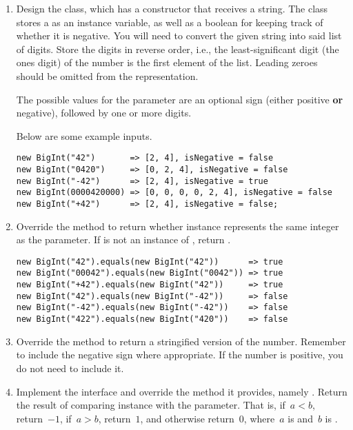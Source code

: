 \begin{enumerate}[label=(\alph*)]
  \item Design the  class, which has a constructor that receives a string. The  class stores a  as an instance variable, as well as a boolean for keeping track of whether it is negative. You will need to convert the given string into said list of digits. Store the digits in reverse order, i.e., the least-significant digit (the ones digit) of the number is the first element of the list. Leading zeroes should be omitted from the representation.

  The possible values for the parameter are an optional sign (either positive \textbf{or} negative), followed by one or more digits.

  Below are some example inputs.
\begin{small}
\begin{verbatim}
new BigInt("42")       => [2, 4], isNegative = false
new BigInt("0420")     => [0, 2, 4], isNegative = false
new BigInt("-42")      => [2, 4], isNegative = true
new BigInt(0000420000) => [0, 0, 0, 0, 2, 4], isNegative = false
new BigInt("+42")      => [2, 4], isNegative = false;
\end{verbatim}
\end{small}

  \item Override the  method to return whether  instance represents the same integer as the parameter. If  is not an instance of , return .

\begin{small}
\begin{verbatim}
new BigInt("42").equals(new BigInt("42"))      => true
new BigInt("00042").equals(new BigInt("0042")) => true
new BigInt("+42").equals(new BigInt("42"))     => true
new BigInt("42").equals(new BigInt("-42"))     => false
new BigInt("-42").equals(new BigInt("-42"))    => false
new BigInt("422").equals(new BigInt("420"))    => false
\end{verbatim}
\end{small}

  \item Override the  method to return a stringified version of the number. Remember to include the negative sign where appropriate. If the number is positive, you do not need to include it.

  \item Implement the  interface and override the method it provides, namely . Return the result of comparing  instance with the parameter. That is, if~$a < b$, return~$-1$, if~$a > b$, return~$1$, and otherwise return~$0$, where~$a$ is  and~$b$ is .


\end{enumerate}

